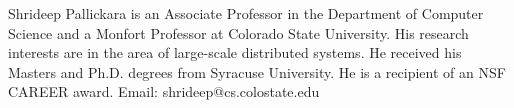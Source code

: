 \documentclass[9pt,journal,compsoc]{IEEEtran}
\begin{document}
%
\vspace{-1.56cm}
\begin{IEEEbiography}{Shrideep Pallickara} is an Associate Professor in the Department of Computer Science and a Monfort Professor at Colorado State University. His research interests are in the area of large-scale distributed systems. He received his Masters and Ph.D. degrees from Syracuse University. He is a recipient of an NSF CAREER award. Email: shrideep@cs.colostate.edu
\enlargethispage{0.7cm}
\end{IEEEbiography}
\end{document}
